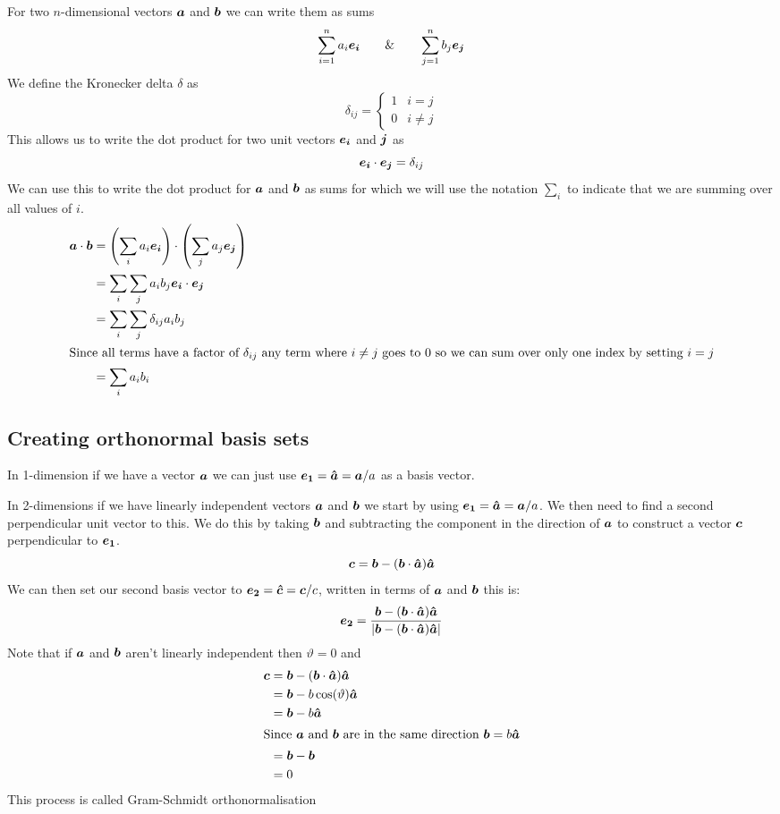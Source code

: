 \documentclass{article}
\begin{document}
    For two \(n\)-dimensional vectors \(\bm{a}\) and \(\bm{b}\) we can write them as sums
    \[\sum_{i=1}^{n}a_i\bm{e_{i}} \qquad \& \qquad \sum_{j=1}^{n}b_j\bm{e_{j}}\]
    We define the Kronecker delta \(\delta\) as
    \[
        \delta_{ij} = \left\{
        \begin{array}{cc}
            1 & i = j\\
            0 & i \ne j
        \end{array}
        \right.
    \]
    This allows us to write the dot product for two unit vectors \(\bm{e_{i}}\) and \(\bm{j}\) as
    \[\bm{e_{i}}\cdot \bm{e_{j}} = \delta_{ij}\]
    We can use this to write the dot product for \(\bm{a}\) and \(\bm{b}\) as sums for which we will use the notation \(\sum_i\) to indicate that we are summing over all values of \(i\).
    \begin{align*}
        \bm{a}\cdot\bm{b} &= \left(\sum_i a_i\bm{e_{i}}\right)\cdot\left(\sum_j a_j\bm{e_{j}}\right)\\
        &= \sum_i\sum_ja_ib_j\bm{e_{i}}\cdot \bm{e_{j}}\\
        &= \sum_i\sum_j\delta_{ij}a_ib_j\\
        \intertext{Since all terms have a factor of \(\delta_{ij}\) any term where \(i\ne j\) goes to 0 so we can sum over only one index by setting \(i = j\)}
        &= \sum_i a_ib_i
    \end{align*}
    
    \subsection{Creating orthonormal basis sets}
    In 1-dimension if we have a vector \(\bm{a}\) we can just use \(\bm{e_{1}} = \bm{\hat{a}} = \bm{a}/a\) as a basis vector.
    
    In 2-dimensions if we have linearly independent vectors \(\bm{a}\) and \(\bm{b}\) we start by using \(\bm{e_{1}} = \bm{\hat{a}} = \bm{a}/a\).
    We then need to find a second perpendicular unit vector to this. We do this by taking \(\bm{b}\) and subtracting the component in the direction of \(\bm{a}\) to construct a vector \(\bm{c}\) perpendicular to \(\bm{e_{1}}\).
    \[\bm{c} = \bm{b} - (\bm{b}\cdot\bm{\hat{a}})\bm{\hat{a}}\]
    We can then set our second basis vector to \(\bm{e_{2}} = \bm{\hat{c}} = \bm{c}/c\), written in terms of \(\bm{a}\) and \(\bm{b}\) this is:
    \[\bm{e_{2}} = \frac{\bm{b} - (\bm{b}\cdot\bm{\hat{a}})\bm{\hat{a}}}{|\bm{b} - (\bm{b}\cdot\bm{\hat{a}})\bm{\hat{a}}|}\]
    Note that if \(\bm{a}\) and \(\bm{b}\) aren't linearly independent then \(\vartheta = 0\) and 
    \begin{align*}
        \bm{c} &= \bm{b} - (\bm{b}\cdot\bm{\hat{a}})\bm{\hat{a}}\\
        &= \bm{b} - b\cos(\vartheta)\bm{\hat{a}}\\
        &= \bm{b} - b\bm{\hat{a}}\\
        \intertext{Since \(\bm{a}\) and \(\bm{b}\) are in the same direction \(\bm{b} = b\bm{\hat{a}}\)}
        &= \bm{b} - \bm{b}\\
        &= 0
    \end{align*}
    This process is called Gram-Schmidt orthonormalisation
    
\end{document}
